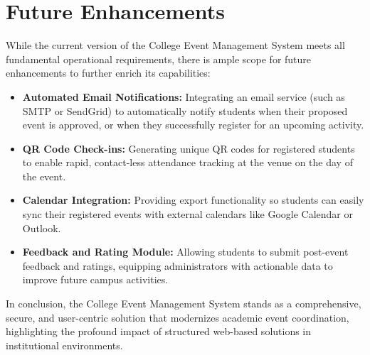\section{Future Enhancements}
While the current version of the College Event Management System meets all fundamental operational requirements, there is ample scope for future enhancements to further enrich its capabilities:
\begin{itemize}
    \item \textbf{Automated Email Notifications:} Integrating an email service (such as SMTP or SendGrid) to automatically notify students when their proposed event is approved, or when they successfully register for an upcoming activity.
    \item \textbf{QR Code Check-ins:} Generating unique QR codes for registered students to enable rapid, contact-less attendance tracking at the venue on the day of the event.
    \item \textbf{Calendar Integration:} Providing export functionality so students can easily sync their registered events with external calendars like Google Calendar or Outlook.
    \item \textbf{Feedback and Rating Module:} Allowing students to submit post-event feedback and ratings, equipping administrators with actionable data to improve future campus activities.
\end{itemize}
In conclusion, the College Event Management System stands as a comprehensive, secure, and user-centric solution that modernizes academic event coordination, highlighting the profound impact of structured web-based solutions in institutional environments.

